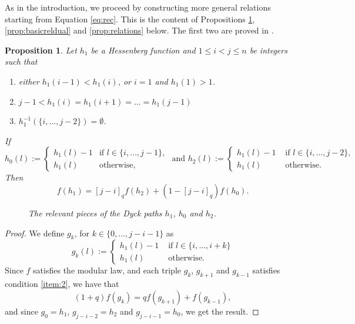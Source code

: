 \documentclass[10pt]{amsart}
\newtheorem{Prop}[Lem]{Proposition}
\theoremstyle{definition}
\newcommand{\dyckpath}[2]{
\draw[line width=2pt] (#1) foreach \dir in {#2}{ -- ++(\dir*90:1)};
}
\begin{document}
    As in the introduction, we proceed by constructing more general relations starting from Equation \eqref{eq:rec}. This is the content of Propositions \ref{prop:basicrel},  \ref{prop:basicreldual} and \ref{prop:relations} below. The first two are proved in \cite[Theorem 3.4 (a)]{HNY}.


 \begin{Prop}
    \label{prop:basicrel}
    Let $h_1$ be a Hessenberg function and $1\leq i<j\leq n$ be integers such that
\begin{enumerate}
    \item either $h_1(i-1)<h_1(i)$, or $i=1$ and $h_1(1)>1$.
    \item $j-1<h_1(i)=h_1(i+1)=\ldots=h_1(j-1)$%
    \item $h_1^{-1}(\{i,\ldots, j-2\})=\emptyset$.
\end{enumerate}
If
\[
h_0(l):=\begin{cases}
h_1(l)-1&\text{if }l\in \{i,\ldots, j-1\},\\
h_1(l)&\text{otherwise},
\end{cases}
\text{ and }
h_2(l):=\begin{cases}
h_1(l)-1 &\text{ if }l\in \{i,\ldots, j-2\},\\
h_1(l)&\text{ otherwise.}
\end{cases}
\]
Then
\[
f(h_1)=[j-i]_qf(h_2)+(1-[j-i]_q)f(h_0).
\]
\begin{figure}[htb]  \centering
{}
\caption{The relevant pieces of the Dyck paths $h_1$, $h_0$ and $h_2$.}
\label{fig:h0h2a}
\end{figure}
\end{Prop}
\begin{proof}
We define $g_k$, for $k\in \{0,\ldots, j-i-1\}$ as
\[
g_k(l):=\begin{cases}
h_1(l)-1 &\text{ if }l\in \{i,\ldots, i+k\}\\
h_1(l)& \text{ otherwise}.
\end{cases}
\]
Since $f$ satisfies the modular law, and each triple $g_{k}$, $g_{k+1}$ and $g_{k-1}$ satisfies condition \eqref{item:2}, we have that
\[
(1+q)f(g_k)=qf(g_{k+1})+f(g_{k-1}),
\]
and since $g_0=h_1$, $g_{j-i-2}=h_2$ and $g_{j-i-1}=h_0$, we get the result.
\end{proof}
\end{document}
